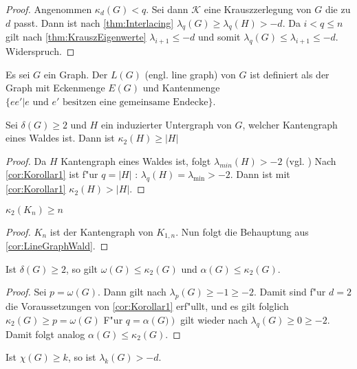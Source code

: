 \begin{proof}
  Angenommen $\kappa_d(G) < q$. Sei dann $\mathcal{K}$ eine Krauszzerlegung von $G$ die zu $d$ passt. Dann ist nach \ref{thm:Interlacing} $\lambda_{q}(G)\geq \lambda_{q}(H) > -d$. 
  Da $i < q \leq n$ gilt nach \ref{thm:KrauszEigenwerte} $\lambda_{i+1}\leq -d$ und somit $\lambda_{q}(G)\leq \lambda_{i+1} \leq -d$. Widerspruch.
\end{proof}
Es sei $G$ ein Graph. Der  $L(G)$ (engl. line graph) von $G$ ist definiert als der Graph mit Eckenmenge $E(G)$ und Kantenmenge $\{ee'|e\text{ und } e' \text{ besitzen eine gemeinsame Endecke}\}$.

\begin{corollary}
  \label{cor:LineGraphWald}
  Sei $\delta(G) \geq 2$ und $H$ ein induzierter Untergraph von $G$, welcher Kantengraph eines Waldes ist. 
  Dann ist $\kappa_{2}(H)\geq \left|H\right|$
\end{corollary}

\begin{proof}
  Da $H$ Kantengraph eines Waldes ist, folgt $\lambda_{min}(H) > -2$ (vgl. \cite[3.4.10]{zbMATH05625877}) 
  Nach \ref{cor:Korollar1} ist f"ur $q=\left|H\right|$ : $\lambda_q(H)=\lambda_{\text{min}}> -2$. Dann ist mit \ref{cor:Korollar1} $\kappa_{2}\left( H \right) > \left| H\right|$.
\end{proof}

\begin{corollary}[Klotz]
  $\kappa_{2}\left( K_n \right) \geq n$
\end{corollary}

\begin{proof}
  $K_n$ ist der Kantengraph von $K_{1,n}$. Nun folgt die Behauptung aus \ref{cor:LineGraphWald}.
\end{proof}
\begin{corollary}
  Ist $\delta\left( G \right) \geq 2$, so gilt $\omega\left( G \right)\leq \kappa_{2}\left( G \right)$ und $\alpha\left( G \right)\leq \kappa_{2}\left( G \right)$.
  \label{cor:alphaomegakrausz}
\end{corollary}

\begin{proof}
  Sei $p = \omega(G)$. Dann gilt nach $\lambda_{p}\left( G \right)\geq -1\geq -2$. Damit sind f"ur $d=2$ die Voraussetzungen von \ref{cor:Korollar1} erf"ullt, und es gilt folglich $\kappa_{2}\left( G \right)\geq p = \omega\left( G \right)$ 
  F"ur $q=\alpha\left( G) \right)$ gilt wieder nach $\lambda_{q}\left( G \right)\geq 0 \geq -2$. Damit folgt analog $\alpha\left( G \right) \leq \kappa_{2}\left( G \right)$.
\end{proof}
\begin{conjecture}[$C_{d}$]
  \label{con:MainConjecture}
  Ist $\chi\left( G \right) \geq k$, so ist $\lambda_k\left( G \right) > -d$.
\end{conjecture}

